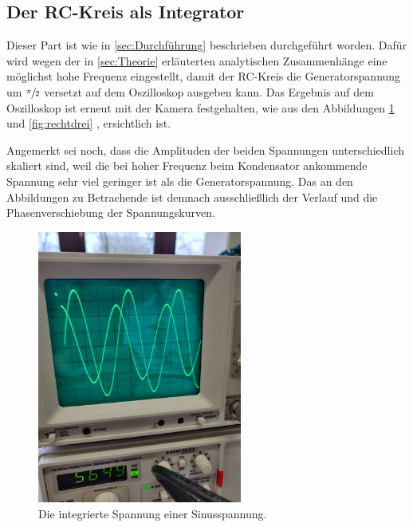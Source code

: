 \FloatBarrier

\subsection{Der RC-Kreis als Integrator}

Dieser Part ist wie in \ref{sec:Durchführung} beschrieben durchgeführt worden. 
Dafür wird wegen der in \ref{sec:Theorie} erläuterten analytischen Zusammenhänge eine möglichst hohe Frequenz eingestellt, 
damit der RC-Kreis die Generatorspannung um $\sfrac{\pi}{2}$ versetzt auf dem Oszilloskop ausgeben kann. 
Das Ergebnis auf dem Oszilloskop ist erneut mit der Kamera festgehalten, wie aus den Abbildungen \ref{fig:int_sinus} und 
\ref{fig:rechtdrei} ,  ersichtlich ist. 

Angemerkt sei noch, dass die Amplituden der beiden Spannungen unterschiedlich skaliert sind, weil die bei hoher Frequenz 
beim Kondensator ankommende Spannung sehr viel geringer ist als die Generatorspannung. 
Das an den Abbildungen zu Betrachende ist demnach ausschließlich der Verlauf und die Phasenverschiebung der Spannungskurven. 

\begin{figure}
    \centering
    \includegraphics[angle=-90,width=0.6\textwidth]{plots/sinus.jpg}
    \caption{Die integrierte Spannung einer Sinusspannung.}
    \label{fig:int_sinus}
\end{figure}

